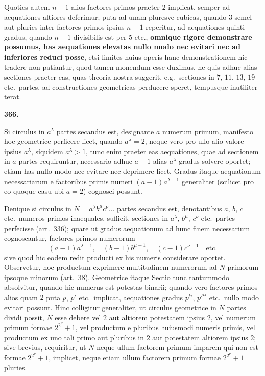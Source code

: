 \documentclass[12pt,a4paper]{article}
\theoremstyle{plain}
\theoremstyle{definition}
\theoremstyle{remark}
\begin{document}
Quoties autem $n - 1$ alios factores primos praeter $2$ implicat, semper ad aequationes altiores deferimur; puta ad unam pluresve cubicas, quando $3$ semel aut pluries inter factores primos ipsius $n-1$ reperitur, ad aequationes quinti gradus, quando $n-1$ divisibilis est per $5$ etc., \textbf{omnique rigore demonstrare possumus, has aequationes elevatas nullo modo nec evitari nec ad inferiores reduci posse}, etsi limites huius operis hanc demonstrationem hic tradere non patiantur, quod tamen monendum esse duximus, ne quis adhuc alias sectiones praeter eas, quas theoria nostra suggerit, e.g.\ sectiones in $7$, $11$, $13$, $19$ etc.\ partes, ad constructiones geometricas perducere speret, tempusque inutiliter terat.

\vspace{1em}

\begin{center}
\textbf{366.}
\end{center}

Si circulus in $a^\lambda$ partes secandus est, designante $a$ numerum primum, manifesto hoc geometrice perficere licet, quando $a^\lambda = 2$, neque vero pro ullo alio valore ipsius $a^\lambda$, siquidem $a^\lambda > 1$, tunc enim praeter eas aequationes, quae ad sectionem in $a$ partes requiruntur, necessario adhuc $a-1$ alias $a^\lambda$ gradus solvere oportet; etiam has nullo modo nec evitare nec deprimere licet. Gradus itaque aequationum necessariarum e factoribus primis numeri $(a-1)a^{\lambda-1}$ generaliter (scilicet pro eo quoque casu ubi $a = 2$) cognosci possunt.

Denique si circulus in $N = a^\lambda b^\mu c^\nu \ldots$ partes secandus est, denotantibus $a$, $b$, $c$ etc.\ numeros primos inaequales, sufficit, sectiones in $a^\lambda$, $b^\mu$, $c^\nu$ etc.\ partes perfecisse (art.\ 336); quare ut gradus aequationum ad hunc finem necessarium cognoscantur, factores primos numerorum
\[(a-1)a^{\lambda-1}, \quad (b-1)b^{\mu-1}, \quad (c-1)c^{\nu-1} \quad \text{etc.}\]
sive quod hic eodem redit producti ex his numeris considerare oportet. Observetur, hoc productum exprimere multitudinem numerorum ad $N$ primorum ipsoque minorum (art.\ 38). Geometrice itaque Sectio tunc tantummodo absolvitur, quando hic numerus est potestas binarii; quando vero factores primos alios quam $2$ puta $p$, $p'$ etc.\ implicat, aequationes gradus $p^{ti}$, $p'^{ti}$ etc.\ nullo modo evitari possunt. Hinc colligitur generaliter, ut circulus geometrice in $N$ partes dividi possit, $N$ esse debere vel $2$ aut altiorem potestatem ipsius $2$, vel numerum primum formae $2^{2^\nu} + 1$, vel productum e pluribus huiusmodi numeris primis, vel productum ex uno tali primo aut pluribus in $2$ aut potestatem altiorem ipsius $2$; sive brevius, requiritur, ut $N$ neque ullum factorem primum imparem qui non est formae $2^{2^\nu} + 1$, implicet, neque etiam ullum factorem primum formae $2^{2^\nu} + 1$ pluries.
\end{document}
